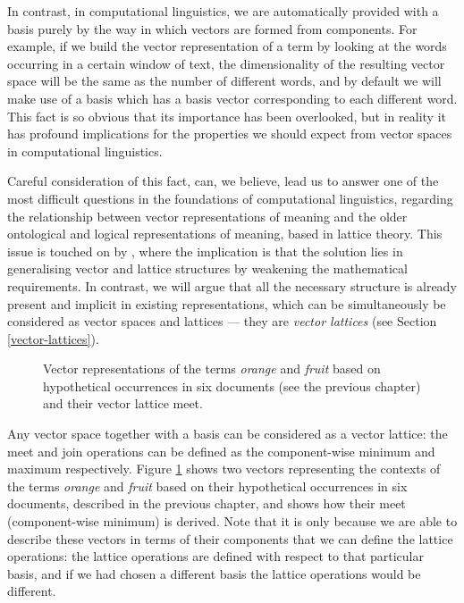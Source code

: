 \documentclass[11pt]{report}
\begin{document}
In contrast, in computational linguistics, we are automatically provided with a basis purely by the way in which vectors are formed from components. For example, if we build the vector representation of a term by looking at the words occurring in a certain window of text, the dimensionality of the resulting vector space will be the same as the number of different words, and by default we will make use of a basis which has a basis vector corresponding to each different word. This fact is so obvious that its importance has been overlooked, but in reality it has profound implications for the properties we should expect from vector spaces in computational linguistics.

Careful consideration of this fact, can, we believe, lead us to answer one of the most difficult questions in the foundations of computational linguistics, regarding the relationship between vector representations of meaning and the older ontological and logical representations of meaning, based in lattice theory. This issue is touched on by \cite{Widdows:04}, where the implication is that the solution lies in generalising vector and lattice structures by weakening the mathematical requirements. In contrast, we will argue that all the necessary structure is already present and implicit in existing representations, which can be simultaneously be considered as vector spaces and lattices --- they are \emph{vector lattices} (see Section \ref{vector-lattices}).

\begin{figure}
\begin{center}

\caption{Vector representations of the terms \emph{orange} and \emph{fruit} based on hypothetical occurrences in six documents (see the previous chapter) and their vector lattice meet.}
\label{orangefruit}
\end{center}
\end{figure}

Any vector space together with a basis can be considered as a vector lattice: the meet and join operations can be defined as the component-wise minimum and maximum respectively. Figure \ref{orangefruit} shows two vectors representing the contexts of the terms \emph{orange} and \emph{fruit} based on their hypothetical occurrences in six documents, described in the previous chapter, and shows how their meet (component-wise minimum) is derived. Note that it is only because we are able to describe these vectors in terms of their components that we can define the lattice operations: the lattice operations are defined with respect to that particular basis, and if we had chosen a different basis the lattice operations would be different.
\end{document}

